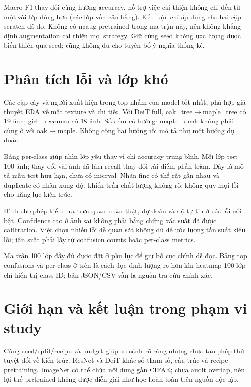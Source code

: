 \documentclass[11pt,a4paper]{article}
\begin{document}
Macro-F1 thay đổi cùng hướng accuracy, hỗ trợ việc cải thiện không chỉ đến từ một vài lớp đông hơn (các lớp vốn cân bằng). Kết luận chỉ áp dụng cho hai cặp scratch đã đo. Không có noaug pretrained trong ma trận này, nên không khẳng định augmentation cải thiện mọi strategy. Giữ cùng seed không ước lượng được biến thiên qua seed; cũng không đủ cho tuyên bố ý nghĩa thống kê.
\clearpage

\section{Phân tích lỗi và lớp khó}\label{sec:errors}

Các cặp cây và người xuất hiện trong top nhầm của model tốt nhất, phù hợp giả thuyết EDA về mất texture và chi tiết. Với DeiT full, oak\_tree$\to$maple\_tree có 19 ảnh; girl$\to$woman có 18 ảnh. Số đếm có hướng: maple$\to$oak không phải cùng ô với oak$\to$maple. Không cộng hai hướng rồi mô tả như một hướng dự đoán.


Bảng per-class giúp nhìn lớp yếu thay vì chỉ accuracy trung bình. Mỗi lớp test 100 ảnh; thay đổi vài ảnh đã làm recall thay đổi vài điểm phần trăm. Đây là mô tả mẫu test hữu hạn, chưa có interval. Nhãn fine có thể rất gần nhau và duplicate có nhãn xung đột khiến trần chất lượng không rõ; không quy mọi lỗi cho năng lực kiến trúc.
\clearpage

Hình cho phép kiểm tra trực quan nhãn thật, dự đoán và độ tự tin ở các lỗi nổi bật. Confidence cao ở ảnh sai không phải bằng chứng xác suất đã được calibration. Việc chọn nhiều lỗi dễ quan sát không đủ để ước lượng tần suất kiểu lỗi; tần suất phải lấy từ confusion counts hoặc per-class metrics.

Ma trận 100 lớp đầy đủ được đặt ở phụ lục để giữ bố cục chính dễ đọc. Bảng top confusions và per-class ở trên là cách đọc định lượng rõ hơn khi heatmap 100 lớp chỉ hiển thị class ID; bản JSON/CSV vẫn là nguồn tra cứu chính xác.
\clearpage

\section{Giới hạn và kết luận trong phạm vi study}\label{sec:limits}
Cùng seed/split/recipe và budget giúp so sánh rõ ràng nhưng chưa tạo phép thử tuyệt đối về kiến trúc. ResNet và DeiT khác số tham số, cấu trúc và recipe pretraining. ImageNet có thể chứa nội dung gần CIFAR; chưa audit overlap, nên lợi thế pretrained không được diễn giải như học hoàn toàn trên nguồn độc lập.
\end{document}
